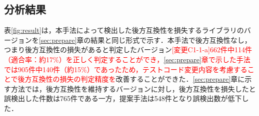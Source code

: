 \documentclass[submit]{ipsj}
\begin{document}
{\vspace{-2mm}
\subsection{分析結果}


\begin{table}[t]
\centering
\caption{テストコード変更内容に基づく後方互換性損失の検出結果}
\label{fig:result}
\vspace{-4mm}
\end{table}

表\ref{fig:result}は，本手法によって検出した後方互換性を損失するライブラリのバージョンを\ref{sec:prepare}章の結果と同じ形式で示す．本手法で後方互換性なし，つまり後方互換性の損失があると判定したバージョン\textcolor{red}{[変更C1-1-a]662件中114件（適合率：約17\%）を正しく判定することができ，\ref{sec:prepare}章で示した手法では905件中140件（約15\%）であったため，テストコード変更内容を考慮することで後方互換性の損失の判定精度を}改善することができた．\ref{sec:prepare}章に示す方法では，後方互換性を維持するバージョンに対し，後方互換性を損失したと誤検出した件数は765件である一方，提案手法は548件となり誤検出数が低下した．

}
\end{document}
